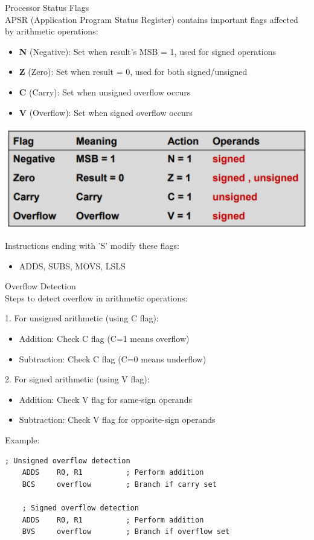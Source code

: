 \begin{concept}{Processor Status Flags}\\
APSR (Application Program Status Register) contains important flags affected by arithmetic operations:
\begin{itemize}
  \item \textbf{N} (Negative): Set when result's MSB = 1, used for signed operations
  \item \textbf{Z} (Zero): Set when result = 0, used for both signed/unsigned
  \item \textbf{C} (Carry): Set when unsigned overflow occurs
  \item \textbf{V} (Overflow): Set when signed overflow occurs
\end{itemize}

\includegraphics[width=\linewidth]{images/flags-arithmetic.png}

Instructions ending with 'S' modify these flags:
\begin{itemize}
  \item ADDS, SUBS, MOVS, LSLS
\end{itemize}
\end{concept}

\begin{KR}{Overflow Detection}\\
Steps to detect overflow in arithmetic operations:

1. For unsigned arithmetic (using C flag):
\begin{itemize}
  \item Addition: Check C flag (C=1 means overflow)
  \item Subtraction: Check C flag (C=0 means underflow)
\end{itemize}

2. For signed arithmetic (using V flag):
\begin{itemize}
  \item Addition: Check V flag for same-sign operands
  \item Subtraction: Check V flag for opposite-sign operands
\end{itemize}

Example:
\begin{lstlisting}[language=armasm, style=basesmol]
    ; Unsigned overflow detection
    ADDS    R0, R1          ; Perform addition
    BCS     overflow        ; Branch if carry set
    
    ; Signed overflow detection
    ADDS    R0, R1          ; Perform addition
    BVS     overflow        ; Branch if overflow set
\end{lstlisting}
\end{KR}

